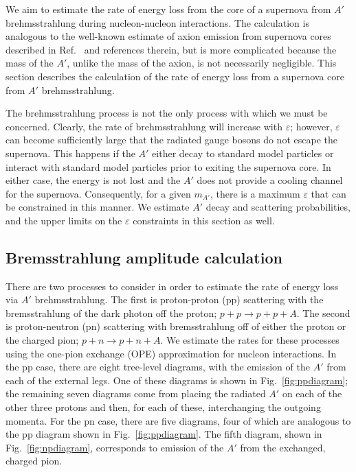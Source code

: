 \documentclass[nofootinbib,prd,superscriptaddress,twocolumn]{revtex4}
\begin{document}
We aim to estimate the rate of energy loss from the core of a supernova from $A'$ brehmsstrahlung 
during nucleon-nucleon interactions. The calculation is analogous to the well-known estimate of axion 
emission from supernova cores described in Ref.~\cite{raffelt96_book} and references therein, but is 
more complicated because the mass of the $A'$, unlike the mass of the axion, is not necessarily 
negligible. This section describes the calculation of the rate of energy loss from a supernova core 
from $A'$ brehmsstrahlung. 

The brehmsstrahlung process is not the only process with which we must be concerned. Clearly, the rate of 
brehmsstrahlung will increase with $\varepsilon$; however, $\varepsilon$ can become sufficiently large 
that the radiated gauge bosons do not escape the supernova. This happens if the $A'$ either decay to 
standard model particles or interact with standard model particles prior to exiting the supernova core. 
In either case, the energy is not lost and the $A'$ does not provide a cooling channel for the supernova. 
Consequently, for a given $m_{A'}$, there is a maximum $\varepsilon$ that can be constrained in this 
manner. We estimate $A'$ decay and scattering probabilities, and the upper limits on the $\varepsilon$ 
constraints in this section as well. 

	
\subsection{Bremsstrahlung amplitude calculation}


There are two processes to consider in order to estimate the rate of energy loss via $A'$ brehmsstrahlung. The first is  
proton-proton (pp) scattering with the bremsstrahlung of the dark photon off the proton; $p+p \rightarrow p+p+A$. The 
second is proton-neutron (pn) scattering with bremsstrahlung off of either the proton or the charged pion; 
$p+n \rightarrow p+n+A$. We estimate the rates for these processes using the one-pion exchange (OPE) 
approximation for nucleon interactions. In the pp case, there are eight tree-level diagrams, 
with the emission of the $A'$ from each of the external legs. One of these diagrams is shown 
in Fig.~\ref{fig:ppdiagram}; the remaining seven diagrams come from placing the radiated $A'$ 
on each of the other three protons and then, for each of these, interchanging the outgoing momenta. 
For the pn case, there are five diagrams, four of which are analogous to the pp diagram shown in 
Fig.~\ref{fig:ppdiagram}. The fifth diagram, shown in Fig.~\ref{fig:npdiagram}, corresponds to 
emission of the $A'$ from the exchanged, charged pion.
\end{document}
